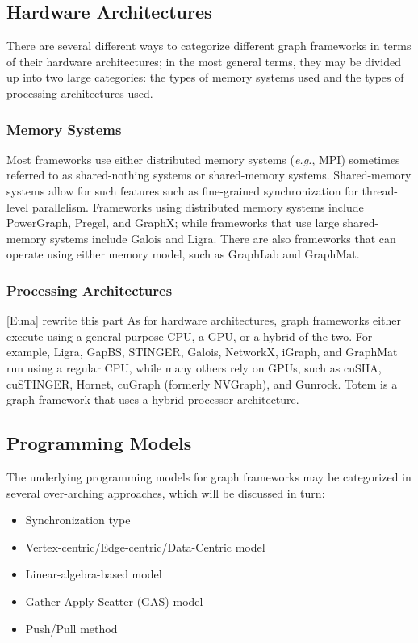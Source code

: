 \subsection{Hardware Architectures}
There are several different ways to categorize different graph frameworks in terms of their hardware architectures; in the most general terms, they may be divided up into two large categories: the types of memory systems used and the types of processing architectures used.  

\subsubsection{Memory Systems}
Most frameworks use either distributed memory systems (\emph{e.g.}, MPI) sometimes referred to as shared-nothing systems or 
shared-memory systems. Shared-memory systems allow for such features such as fine-grained synchronization for thread-level parallelism. Frameworks using distributed memory systems include PowerGraph\cite{180251}, Pregel\cite{Malewicz:2010:PSL:1807167.1807184}, and GraphX\cite{gonzalez2014graphx}; while frameworks that use large shared-memory systems include Galois and Ligra\cite{shun2013ligra}. There are also frameworks that can operate using either memory model, such as GraphLab\cite{Low:2012:DGF:2212351.2212354} and GraphMat\cite{Sundaram:2015:GHP:2809974.2809983}.

\subsubsection{Processing Architectures}
[Euna] rewrite this part
As for hardware architectures, graph frameworks either execute using a general-purpose CPU, a GPU, or a hybrid of the two.  For example, Ligra, GapBS, STINGER, Galois, NetworkX, iGraph, and GraphMat run using a regular CPU, while many others rely on GPUs, such as cuSHA, cuSTINGER, Hornet, cuGraph (formerly NVGraph), and Gunrock. Totem is a graph framework that uses a hybrid processor architecture.

\subsection{Programming Models}
The underlying programming models for graph frameworks may be categorized in several over-arching approaches, which will be discussed in turn:
\begin{itemize}
    \item Synchronization type
    \item Vertex-centric/Edge-centric/Data-Centric model
    \item Linear-algebra-based model
    \item Gather-Apply-Scatter (GAS) model
    \item Push/Pull method
\end{itemize}

